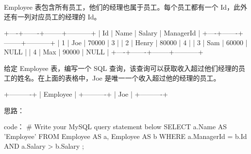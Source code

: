 Employee 表包含所有员工，他们的经理也属于员工。每个员工都有一个 Id，此外还有一列对应员工的经理的 Id。

+----+-------+--------+-----------+
| Id | Name  | Salary | ManagerId |
+----+-------+--------+-----------+
| 1  | Joe   | 70000  | 3         |
| 2  | Henry | 80000  | 4         |
| 3  | Sam   | 60000  | NULL      |
| 4  | Max   | 90000  | NULL      |
+----+-------+--------+-----------+

给定 Employee 表，编写一个 SQL 查询，该查询可以获取收入超过他们经理的员工的姓名。在上面的表格中，Joe 是唯一一个收入超过他的经理的员工。

+----------+
| Employee |
+----------+
| Joe      |
+----------+



















思路：





















code：
# Write your MySQL query statement below
SELECT a.Name AS 'Employee' 
FROM Employee AS a, Employee AS b 
WHERE a.ManagerId = b.Id AND a.Salary > b.Salary ;